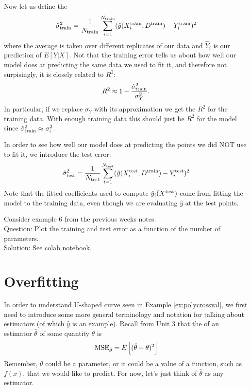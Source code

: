 Now let us define the 
\begin{equation*}
\hat{\sigma}_{\rm train}^2=  \frac{1}{N_{\rm train}}\sum_{i=1}^{N_{\rm train}}(\hat{y}(X_i^{\rm train},D^{\rm train}) - Y_i^{\rm train})^2
\end{equation*}
where the average is taken over different replicates of our data and $\hat{Y}_i$ is our prediction of $E[Y|X]$. Not that the training error tells us about how well our model does at predicting the same data we used to fit it, and therefore not surpisingly, it is closely related to $R^2$:
\begin{equation*}
R^2 \approx 1 - \frac{\hat{\sigma}_{\rm train}^2}{\sigma_Y^2}.
\end{equation*}
In particular, if we replace $\sigma_Y$ with its approximation we get the $R^2$ for the training data. With enough training data this should just be $R^2$ for the model since $\hat{\sigma}_{\rm train}^2 \approx \sigma_{\epsilon}^2$. 


In order to see how well our model does at predicting the points we did NOT use to fit it, we introduce the test error: 
\begin{equation*}
\hat{\sigma}_{\rm test}^2=  \frac{1}{N_{\rm test}}\sum_{i=1}^{N_{\rm test}}(\hat{y}(X_i^{\rm test},D^{\rm train}) - Y_i^{\rm test})^2
\end{equation*}
Note that the fitted coefficients used to compute $\hat{y}_i(X^{\rm test})$ come from fitting the model to the training data, even though we are evaluating $\hat{y}$ at the test points. 

\begin{example}\label{ex:polycrossval}
Consider example 6 from the previous weeks notes. \\

\noindent
\underline{Question:} Plot the training and test error as a function of the number of parameters. \\

\noindent
\underline{Solution:}  See \href{https://colab.research.google.com/drive/1EYcMviowfsnsVe7vsUKlyzkNsddUiTau?usp=sharing}{colab notebook}.
\end{example}

\section{Overfitting}
 In order to understand U-shaped curve seen in Example \ref{ex:polycrossval},  we first need to introduce some more general terminology and notation for talking about estimators (of which $\hat{y}$ is an example). 
Recall from Unit 3 that the  of an estimator $\hat{\theta}$ of some quantity $\theta$ is 
\begin{equation}\label{eq:mse}
{\rm MSE}_{\hat{\theta}}= E\left[(\hat{\theta}- \theta)^2\right]
\end{equation}
Remember, $\theta$ could be a parameter, or it could be a value of a function, such as $f(x)$, that we would like to predict. 
For now, let's just think of $\hat{\theta}$ as any estimator. 

